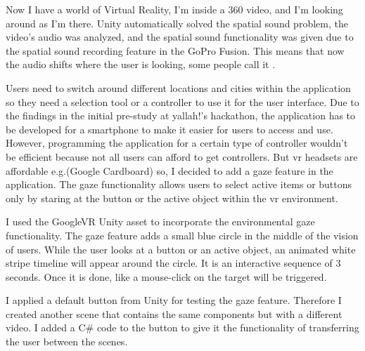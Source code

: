 Now I have a world of Virtual Reality, I'm inside a 360 video, and I'm looking around as I'm there. Unity automatically solved the spatial sound problem, the video's audio was analyzed, and the spatial sound functionality was given due to the spatial sound recording feature in the GoPro Fusion. This means that now the audio shifts where the user is looking, some people call it . 

Users need to switch around different locations and cities within the application so they need a selection tool or a controller to use it for the user interface. Due to the findings in the initial pre-study at \acrshort{yallah!}'s hackathon, the application has to be developed for a smartphone to make it easier for users to access and use. However, programming the application for a certain type of controller wouldn't be efficient because not all users can afford to get controllers. But \acrshort{vr} headsets are affordable e.g.(Google Cardboard) so, I decided to add a gaze feature in the application. The gaze functionality allows users to select active items or buttons only by staring at the button or the active object within the \acrshort{vr} environment.



I used the GoogleVR Unity asset to incorporate the environmental gaze functionality. The gaze feature adds a small blue circle in the middle of the vision of users. While the user looks at a button or an active object, an animated white stripe timeline will appear around the circle. It is an interactive sequence of 3 seconds. Once it is done, like a mouse-click on the target will be triggered. 

I applied a default button from Unity for testing the gaze feature. Therefore I created another scene that contains the same components but with a different video. I added a C\# code to the button to give it the functionality of transferring the user between the scenes. 

